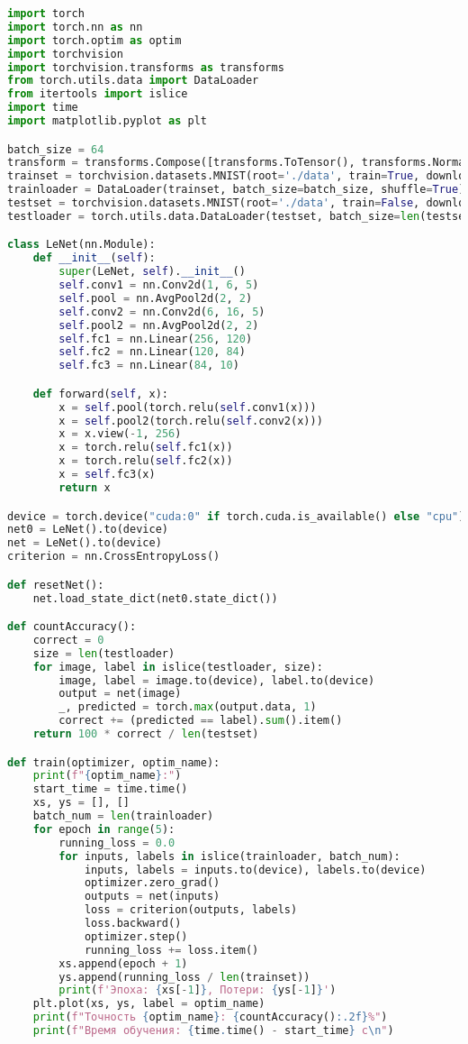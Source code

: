 \documentclass[a4paper, 14pt]{extarticle}
\begin{document}
\begin{lstlisting}[language=Python,caption={LeNet.py},label={lst:code1}]
import torch
import torch.nn as nn
import torch.optim as optim
import torchvision
import torchvision.transforms as transforms
from torch.utils.data import DataLoader
from itertools import islice
import time
import matplotlib.pyplot as plt

batch_size = 64
transform = transforms.Compose([transforms.ToTensor(), transforms.Normalize((0.5,), (0.5,))])
trainset = torchvision.datasets.MNIST(root='./data', train=True, download=True, transform=transform)
trainloader = DataLoader(trainset, batch_size=batch_size, shuffle=True)
testset = torchvision.datasets.MNIST(root='./data', train=False, download=True, transform=transform)
testloader = torch.utils.data.DataLoader(testset, batch_size=len(testset), shuffle=True)

class LeNet(nn.Module):
    def __init__(self):
        super(LeNet, self).__init__()
        self.conv1 = nn.Conv2d(1, 6, 5)
        self.pool = nn.AvgPool2d(2, 2)
        self.conv2 = nn.Conv2d(6, 16, 5)
        self.pool2 = nn.AvgPool2d(2, 2)
        self.fc1 = nn.Linear(256, 120)
        self.fc2 = nn.Linear(120, 84)
        self.fc3 = nn.Linear(84, 10)

    def forward(self, x):
        x = self.pool(torch.relu(self.conv1(x)))
        x = self.pool2(torch.relu(self.conv2(x)))
        x = x.view(-1, 256)
        x = torch.relu(self.fc1(x))
        x = torch.relu(self.fc2(x))
        x = self.fc3(x)
        return x

device = torch.device("cuda:0" if torch.cuda.is_available() else "cpu")
net0 = LeNet().to(device)
net = LeNet().to(device)
criterion = nn.CrossEntropyLoss()

def resetNet():
    net.load_state_dict(net0.state_dict())

def countAccuracy():
    correct = 0
    size = len(testloader)
    for image, label in islice(testloader, size):
        image, label = image.to(device), label.to(device)
        output = net(image)
        _, predicted = torch.max(output.data, 1)
        correct += (predicted == label).sum().item()
    return 100 * correct / len(testset)

def train(optimizer, optim_name):
    print(f"{optim_name}:")
    start_time = time.time()
    xs, ys = [], []
    batch_num = len(trainloader)
    for epoch in range(5):
        running_loss = 0.0
        for inputs, labels in islice(trainloader, batch_num):
            inputs, labels = inputs.to(device), labels.to(device)
            optimizer.zero_grad()
            outputs = net(inputs)
            loss = criterion(outputs, labels)
            loss.backward()
            optimizer.step()
            running_loss += loss.item()
        xs.append(epoch + 1)
        ys.append(running_loss / len(trainset))
        print(f'Эпоха: {xs[-1]}, Потери: {ys[-1]}')
    plt.plot(xs, ys, label = optim_name)
    print(f"Точность {optim_name}: {countAccuracy():.2f}%")
    print(f"Время обучения: {time.time() - start_time} с\n")


\end{lstlisting}
\end{document}
